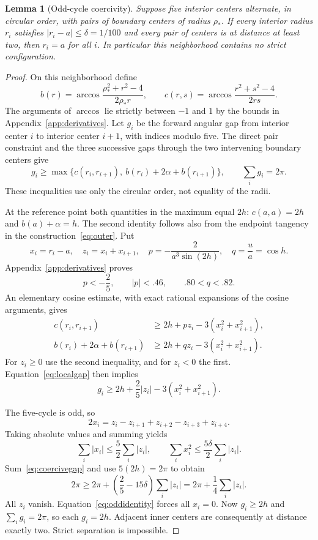 \documentclass[11pt]{amsart}
\newtheorem{lemma}[theorem]{Lemma}
\theoremstyle{definition}
\theoremstyle{remark}
\numberwithin{equation}{section}
\newcommand{\abs}[1]{\lvert #1\rvert}
\newcommand{\rhoopt}{\rho_*}
\begin{document}
\begin{lemma}[Odd-cycle coercivity]\label{lem:local}
Suppose five interior centers alternate, in circular order, with pairs of
boundary centers of radius $\rhoopt$. If every interior radius $r_i$ satisfies
$\abs{r_i-a}\leq\delta=1/100$ and every pair of centers is at distance at
least two, then $r_i=a$ for all $i$. In particular this neighborhood contains
no strict configuration.
\end{lemma}
\begin{proof}
On this neighborhood define
\[
 b(r)=\arccos\frac{\rhoopt^2+r^2-4}{2\rhoopt r},\qquad
 c(r,s)=\arccos\frac{r^2+s^2-4}{2rs}.
\]
The arguments of $\arccos$ lie strictly between $-1$ and $1$ by the bounds
in Appendix~\ref{app:derivatives}. Let $g_i$ be the forward angular gap
from interior center $i$ to interior center $i+1$, with indices modulo five.
The direct pair constraint and the three successive gaps through the two
intervening boundary centers give
\begin{equation}\label{eq:localgap}
 g_i\geq\max\{c(r_i,r_{i+1}),\ b(r_i)+2\alpha+b(r_{i+1})\},
 \qquad \sum_i g_i=2\pi.
\end{equation}
These inequalities use only the circular order, not equality of the radii.

At the reference point both quantities in the maximum equal $2h$:
$c(a,a)=2h$ and $b(a)+\alpha=h$. The second identity follows also from the
endpoint tangency in the construction~\eqref{eq:outer}. Put
\[
 x_i=r_i-a,\quad z_i=x_i+x_{i+1},\quad
 p=-\frac2{a^3\sin(2h)},\quad q=\frac ua=\cos h.
\]
Appendix~\ref{app:derivatives} proves
\begin{equation}\label{eq:derivativebounds}
 p<-\frac25,\qquad |p|<.46,\qquad .80<q<.82.
\end{equation}
An elementary cosine estimate, with exact rational expansions of the
cosine arguments, gives
\begin{align*}
 c(r_i,r_{i+1})
 &\geq2h+pz_i-3(x_i^2+x_{i+1}^2),\\
 b(r_i)+2\alpha+b(r_{i+1})
 &\geq2h+qz_i-3(x_i^2+x_{i+1}^2).
\end{align*}
For $z_i\geq0$ use the second inequality, and for $z_i<0$ the first.
Equation~\eqref{eq:localgap} then implies
\begin{equation}\label{eq:coercivegap}
 g_i\geq2h+\frac25\abs{z_i}-3(x_i^2+x_{i+1}^2).
\end{equation}

The five-cycle is odd, so
\begin{equation}\label{eq:oddidentity}
 2x_i=z_i-z_{i+1}+z_{i+2}-z_{i+3}+z_{i+4}.
\end{equation}
Taking absolute values and summing yields
\[
 \sum_i\abs{x_i}\leq\frac52\sum_i\abs{z_i},\qquad
 \sum_i x_i^2\leq\frac{5\delta}{2}\sum_i\abs{z_i}.
\]
Sum~\eqref{eq:coercivegap} and use $5(2h)=2\pi$ to obtain
\[
 2\pi\geq2\pi+\left(\frac25-15\delta\right)\sum_i\abs{z_i}
       =2\pi+\frac14\sum_i\abs{z_i}.
\]
All $z_i$ vanish. Equation~\eqref{eq:oddidentity} forces all $x_i=0$.
Now $g_i\geq2h$ and $\sum_i g_i=2\pi$, so each $g_i=2h$. Adjacent inner
centers are consequently at distance exactly two. Strict separation is
impossible.
\end{proof}
\end{document}
